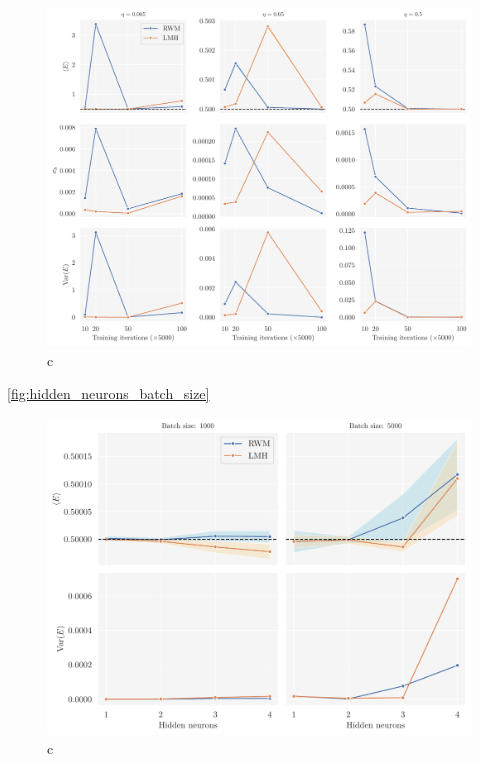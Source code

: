 \begin{figure}[!htb]
\begin{center}\includegraphics[width=\textwidth]{latex/figures/training_cycles_lr.pdf}
\end{center}
\caption{c}
\label{fig:train_iter_lr_batch5000}
\end{figure}


\autoref{fig:hidden_neurons_batch_size}

\begin{figure}[!htb]
\begin{center}\includegraphics[width=\textwidth]{latex/figures/hidden_neurons_batch_size.pdf}
\end{center}
\caption{c}
\label{fig:hidden_neurons_batch_size}
\end{figure}


